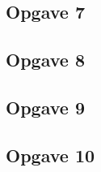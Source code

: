 \documentclass[een]{practicumverslag}
\begin{document}
\lipsum[7-7]

\subsection*{Opgave 7}

\lipsum[7-7]

\subsection*{Opgave 8}

\lipsum[7-7]

\subsection*{Opgave 9}

\lipsum[7-7]

\subsection*{Opgave 10}

\lipsum[7-7]

\clearpage
\end{document}
